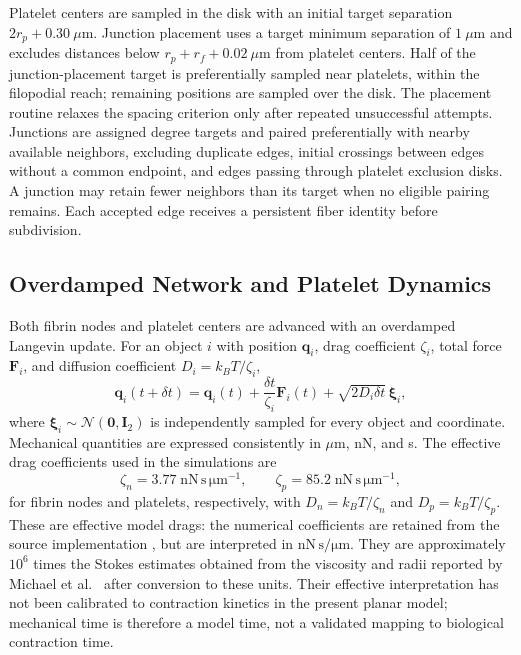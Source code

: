 \documentclass[twocolumn, 10pt]{article}
\begin{document}
Platelet centers are sampled in the disk with an initial target separation $2r_p+0.30~\mu\mathrm m$. Junction placement uses a target minimum separation of $1~\mu\mathrm m$ and excludes distances below $r_p+r_f+0.02~\mu\mathrm m$ from platelet centers. Half of the junction-placement target is preferentially sampled near platelets, within the filopodial reach; remaining positions are sampled over the disk. The placement routine relaxes the spacing criterion only after repeated unsuccessful attempts. Junctions are assigned degree targets and paired preferentially with nearby available neighbors, excluding duplicate edges, initial crossings between edges without a common endpoint, and edges passing through platelet exclusion disks. A junction may retain fewer neighbors than its target when no eligible pairing remains. Each accepted edge receives a persistent fiber identity before subdivision.

\subsection{Overdamped Network and Platelet Dynamics}
Both fibrin nodes and platelet centers are advanced with an overdamped Langevin update. For an object $i$ with position $\mathbf q_i$, drag coefficient $\zeta_i$, total force $\mathbf F_i$, and diffusion coefficient $D_i=k_BT/\zeta_i$,
\begin{equation}
\mathbf q_i(t+\delta t)=\mathbf q_i(t)
+\frac{\delta t}{\zeta_i}\mathbf F_i(t)
+\sqrt{2D_i\delta t}\,\boldsymbol\xi_i,
\label{eq:overdamped}
\end{equation}
where $\boldsymbol\xi_i\sim\mathcal N(\mathbf 0,\mathbf I_2)$ is independently sampled for every object and coordinate. Mechanical quantities are expressed consistently in $\mu\mathrm{m}$, nN, and s. The effective drag coefficients used in the simulations are
\begin{equation}
\zeta_n=3.77\;\mathrm{nN\,s\,\mu m^{-1}},
\qquad
\zeta_p=85.2\;\mathrm{nN\,s\,\mu m^{-1}},
\end{equation}
for fibrin nodes and platelets, respectively, with $D_n=k_BT/\zeta_n$ and $D_p=k_BT/\zeta_p$. These are effective model drags: the numerical coefficients are retained from the source implementation \cite{MichaelCodeOcean2023}, but are interpreted in $\mathrm{nN\,s/\mu m}$. They are approximately $10^6$ times the Stokes estimates obtained from the viscosity and radii reported by Michael et al.~\cite{Michael2023} after conversion to these units. Their effective interpretation has not been calibrated to contraction kinetics in the present planar model; mechanical time is therefore a model time, not a validated mapping to biological contraction time.
\end{document}

